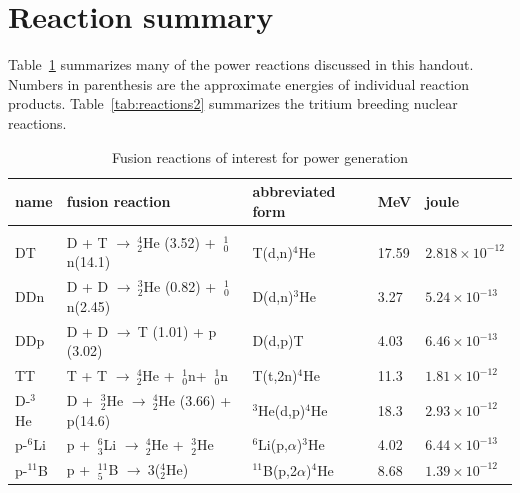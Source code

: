 \documentclass[11pt]{report} %
\begin{document}
\section{Reaction summary}
Table~\ref{tab:reactions1} summarizes many of the power reactions discussed in this handout. Numbers in parenthesis are the approximate energies of individual reaction products. Table~\ref{tab:reactions2} summarizes the tritium breeding nuclear reactions.
\begin{table}
    \begin{tabular}{lllll}
     \vspace{0.5em}name       & fusion reaction                               & abbreviated form            & MeV   & joule            \\ \hline \vspace{-0.7em}\\
    \vspace{0.5em}DT         & D + T $\rightarrow~_2^4$He (3.52) + $~_0^1$n(14.1)  &  T(d,n)$^4$He               & 17.59 &$2.818\times10^{-12}$ \\
    \vspace{0.5em}DDn        & D + D $\rightarrow~_2^3$He (0.82) + $~_0^1$n(2.45) & D(d,n)$^3$He             & 3.27  & $5.24\times10^{-13}$ \\
    \vspace{0.5em}DDp        & D + D $\rightarrow~$T (1.01) + p (3.02)                       & D(d,p)T                     & 4.03  &$6.46\times10^{-13}$  \\
\vspace{0.5em}    TT         & T + T $\rightarrow~_2^4$He + $~_0^1$n+ $~_0^1$n & T(t,2n)$^4$He           & 11.3  &  $1.81\times10^{-12}$ \\
\vspace{0.5em}    D-$^3$He & D + $~_2^3$He $\rightarrow~_2^4$He (3.66) + p(14.6) &$^3$He(d,p)$^4$He     & 18.3  & $2.93\times10^{-12}$ \\
\vspace{0.5em}     p-$^6$Li & p + $~_3^6$Li $\rightarrow~_2^4$He  + $~_2^3$He & $^6$Li(p,$\alpha$)$^3$He & 4.02  &$6.44\times10^{-13}$ \\
\vspace{0.5em}   p-$^{11}$B & p + $~_5^{11}$B $\rightarrow~3$($_2^4$He)  & $^{11}$B(p,2$\alpha$)$^4$He & 8.68  & $1.39\times10^{-12}$   \\
    \end{tabular}\caption{Fusion reactions of interest for power generation}\label{tab:reactions1}
\end{table}
\end{document}
